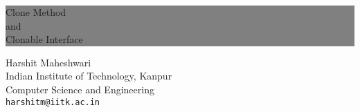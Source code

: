 \thispagestyle{empty} %


\colorbox{grey}{
	\parbox[t]{1.0\linewidth}{
		\centering \fontsize{50pt}{80pt}\selectfont %
		\vspace*{0.7cm} %
		
		\hfill Clone Method \\
		\hfill and\\
		\hfill Clonable Interface\par
		
		\vspace*{0.7cm} %
	}
}


\vfill %


{\centering \large 
\hfill Harshit Maheshwari \\
\hfill Indian Institute of Technology, Kanpur \\
\hfill Computer Science and Engineering\\
\hfill \texttt{harshitm@iitk.ac.in} \\

\HRule{1pt}} %


\clearpage %
